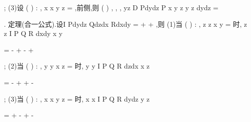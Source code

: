 \int \int 
\int \int 
; 
(3)设
(
)
:
,
x
x y z
\Sigma 
=
,前侧,则
(
)
,
, ,
yz
D
Pdydz
P x y z
y z dydz
\Sigma 
=




\int \int 
\int \int 
. 
\textcolor{lyred}{定理(合一公式)}.设I
Pdydz
Qdzdx
Rdxdy
\Sigma 
=
+
+
\int \int 
,则 
(1)当
(
)
:
,
z
z x y
\Sigma 
=
时,
z
z
I
P
Q
R
dxdy
x
y
\Sigma 




\partial 
\partial 


=
\cdots -
+
\cdots -
+
\cdots 






\partial 
\partial 






\int \int 
; 
(2)当
(
)
:
,
y
y x z
\Sigma 
=
时,
y
y
I
P
Q
R
dzdx
x
z
\Sigma 

\partial 
\partial 





=
\cdots -
+
\cdots +
\cdots -






\partial 
\partial 






\int \int 
; 
(3)当
(
)
:
,
x
x y z
\Sigma 
=
时,
x
x
I
P
Q
R
dydz
y
z
\Sigma 




\partial 
\partial 


=
\cdots +
\cdots -
+
\cdots -






\partial 
\partial 






